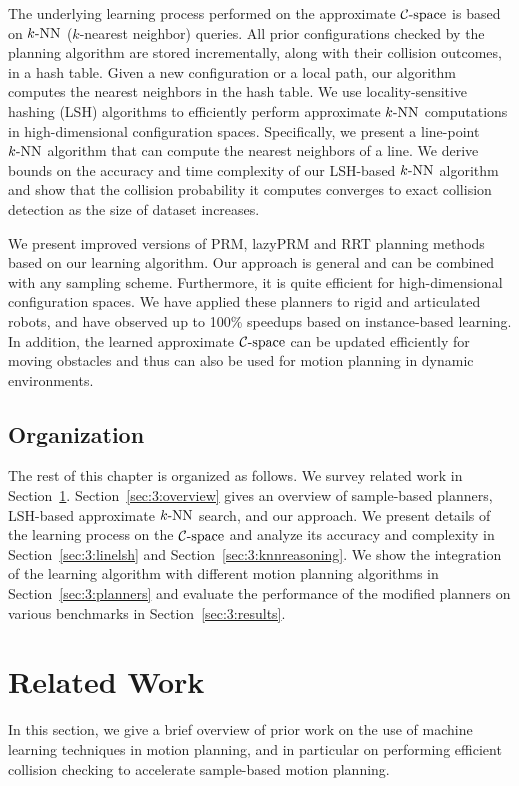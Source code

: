 The underlying learning process performed on the approximate $\mathcal C\text{-space}$ is based on $k\text{-NN}$ ($k$-nearest neighbor) queries. All prior configurations checked
by the planning algorithm are stored incrementally, along with their collision outcomes, in a hash table. Given a new configuration or a local path, our algorithm computes the nearest neighbors in the hash table. We use locality-sensitive hashing (LSH) algorithms to efficiently perform approximate $k\text{-NN}$ computations in high-dimensional configuration spaces. Specifically, we present a line-point $k\text{-NN}$ algorithm that can compute the nearest neighbors of a line.
We derive bounds on the accuracy and time complexity of our LSH-based $k\text{-NN}$ algorithm and show that the collision probability it computes converges to exact collision detection as the size of dataset increases.

We present improved versions of PRM, lazyPRM and RRT planning methods based on our learning algorithm. Our approach is general and can be combined with any sampling scheme. Furthermore, it is quite efficient for high-dimensional configuration spaces. We have applied these planners to rigid and articulated robots, and have observed up to 100\% speedups based on instance-based learning. In addition, the learned approximate $\mathcal C\text{-space}$ can be updated efficiently for moving obstacles and thus can also be used for motion planning in dynamic environments.

\subsection{Organization}
The rest of this chapter is organized as follows. We survey related work in Section~\ref{sec:3:related}. Section~\ref{sec:3:overview} gives an overview of sample-based planners, LSH-based approximate $k\text{-NN}$ search, and our approach. We present details of the learning process on the $\mathcal C\text{-space}$ and analyze its accuracy and complexity in Section~\ref{sec:3:linelsh} and Section~\ref{sec:3:knnreasoning}. We show the integration of the learning algorithm with different motion planning algorithms in Section~\ref{sec:3:planners} and evaluate the performance of the modified planners on various benchmarks in Section~\ref{sec:3:results}.


\section{Related Work}
\label{sec:3:related}

In this section, we give a brief overview of prior work on the use of machine learning techniques in motion planning, and in particular on performing efficient collision checking to accelerate sample-based motion planning.

